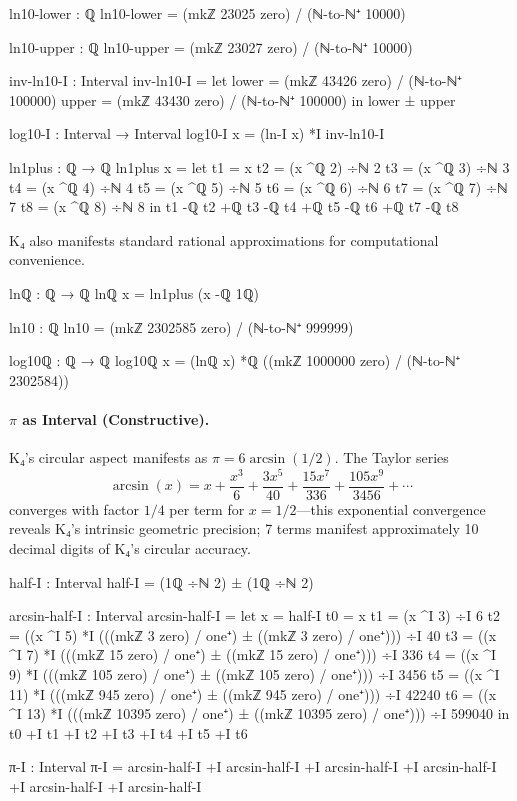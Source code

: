 \documentclass[11pt,a4paper]{book}
\begin{document}
\begin{code}
ln10-lower : ℚ
ln10-lower = (mkℤ 23025 zero) / (ℕ-to-ℕ⁺ 10000)

ln10-upper : ℚ
ln10-upper = (mkℤ 23027 zero) / (ℕ-to-ℕ⁺ 10000)

inv-ln10-I : Interval
inv-ln10-I = 
  let lower = (mkℤ 43426 zero) / (ℕ-to-ℕ⁺ 100000)
      upper = (mkℤ 43430 zero) / (ℕ-to-ℕ⁺ 100000)
  in lower ± upper

log10-I : Interval → Interval
log10-I x = (ln-I x) *I inv-ln10-I

ln1plus : ℚ → ℚ
ln1plus x = 
  let t1 = x
      t2 = (x ^ℚ 2) ÷ℕ 2
      t3 = (x ^ℚ 3) ÷ℕ 3
      t4 = (x ^ℚ 4) ÷ℕ 4
      t5 = (x ^ℚ 5) ÷ℕ 5
      t6 = (x ^ℚ 6) ÷ℕ 6
      t7 = (x ^ℚ 7) ÷ℕ 7
      t8 = (x ^ℚ 8) ÷ℕ 8
  in t1 -ℚ t2 +ℚ t3 -ℚ t4 +ℚ t5 -ℚ t6 +ℚ t7 -ℚ t8

\end{code}

K₄ also manifests standard rational approximations for computational convenience.

\begin{code}
lnℚ : ℚ → ℚ
lnℚ x = ln1plus (x -ℚ 1ℚ)

ln10 : ℚ
ln10 = (mkℤ 2302585 zero) / (ℕ-to-ℕ⁺ 999999)

log10ℚ : ℚ → ℚ
log10ℚ x = (lnℚ x) *ℚ ((mkℤ 1000000 zero) / (ℕ-to-ℕ⁺ 2302584))

\end{code}

\paragraph{$\pi$ as Interval (Constructive).}
K₄'s circular aspect manifests as $\pi = 6 \arcsin(1/2)$. The Taylor series
\[
\arcsin(x) = x + \frac{x^3}{6} + \frac{3x^5}{40} + \frac{15x^7}{336} + \frac{105x^9}{3456} + \cdots
\]
converges with factor $1/4$ per term for $x = 1/2$—this exponential convergence reveals K₄'s intrinsic geometric precision; 7 terms manifest approximately 10 decimal digits of K₄'s circular accuracy.

\begin{code}
half-I : Interval
half-I = (1ℚ ÷ℕ 2) ± (1ℚ ÷ℕ 2)

arcsin-half-I : Interval
arcsin-half-I = 
  let x = half-I
      t0 = x
      t1 = (x ^I 3) ÷I 6
      t2 = ((x ^I 5) *I (((mkℤ 3 zero) / one⁺) ± ((mkℤ 3 zero) / one⁺))) ÷I 40
      t3 = ((x ^I 7) *I (((mkℤ 15 zero) / one⁺) ± ((mkℤ 15 zero) / one⁺))) ÷I 336
      t4 = ((x ^I 9) *I (((mkℤ 105 zero) / one⁺) ± ((mkℤ 105 zero) / one⁺))) ÷I 3456
      t5 = ((x ^I 11) *I (((mkℤ 945 zero) / one⁺) ± ((mkℤ 945 zero) / one⁺))) ÷I 42240
      t6 = ((x ^I 13) *I (((mkℤ 10395 zero) / one⁺) ± ((mkℤ 10395 zero) / one⁺))) ÷I 599040
  in t0 +I t1 +I t2 +I t3 +I t4 +I t5 +I t6

π-I : Interval
π-I = arcsin-half-I +I arcsin-half-I +I arcsin-half-I +I 
      arcsin-half-I +I arcsin-half-I +I arcsin-half-I

\end{code}
\end{document}
